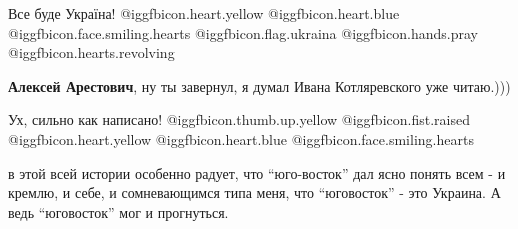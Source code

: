 \begin{itemize}

Все буде Україна!  @igg{fbicon.heart.yellow}  @igg{fbicon.heart.blue}  @igg{fbicon.face.smiling.hearts} @igg{fbicon.flag.ukraina} @igg{fbicon.hands.pray}  @igg{fbicon.hearts.revolving} 

\textbf{Алексей Арестович}, ну ты завернул, я думал Ивана Котляревского уже читаю.)))


Ух, сильно как написано! @igg{fbicon.thumb.up.yellow}  @igg{fbicon.fist.raised}  @igg{fbicon.heart.yellow}  @igg{fbicon.heart.blue}  @igg{fbicon.face.smiling.hearts} 


в этой всей истории особенно радует, что \enquote{юго-восток} дал ясно понять всем - и
кремлю, и себе, и сомневающимся типа меня, что \enquote{юговосток} - это Украина. А
ведь \enquote{юговосток} мог и прогнуться.

\end{itemize} %
